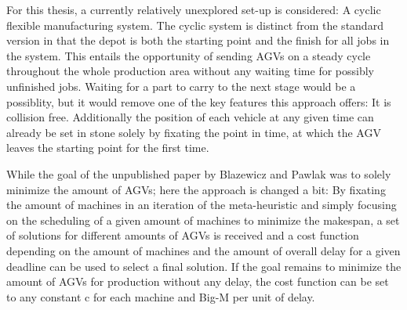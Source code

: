 For this thesis, a currently relatively unexplored set-up is considered: A cyclic flexible manufacturing system. The cyclic system is
distinct from the standard version in that the depot is both the starting point and the finish for all jobs in the system. This entails the opportunity of sending AGVs on a steady cycle throughout the whole production area without any waiting time for possibly unfinished jobs. Waiting
for a part to carry to the next stage would be a possiblity, but it would remove one of the key features this approach offers: It is collision
free. Additionally the position of each vehicle at any given time can already be set in stone solely by fixating the point in time, at which the
AGV leaves the starting point for the first time. 



While the goal of the unpublished paper by Blazewicz and Pawlak \cite{blazewicz198} was to solely minimize the amount of AGVs; here the approach is changed a bit:
By fixating the amount of machines in an iteration of the meta-heuristic and simply focusing on the scheduling of a given
amount of machines to minimize the makespan, a set of solutions for different amounts of AGVs is received and a cost function depending
on the amount of machines and the amount of overall delay for a given deadline can be used to select a final
solution. If the goal remains to minimize the amount of AGVs for production without any delay, the cost function can be set
to any constant c for each machine and Big-M per unit of delay.






